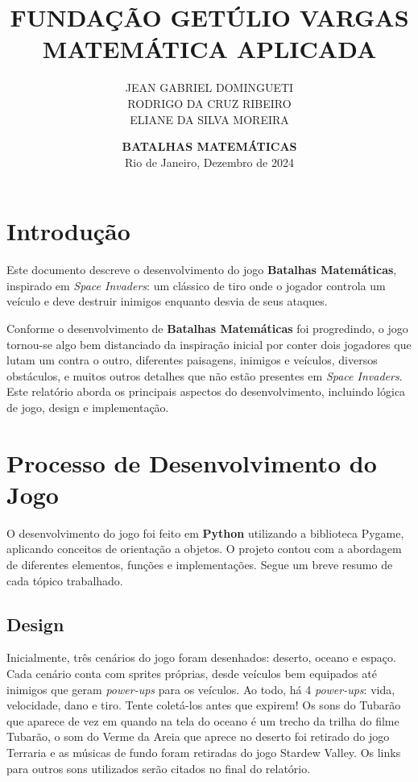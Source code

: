 \documentclass[12pt,a4paper]{article}
\title{\textbf{FUNDAÇÃO GETÚLIO VARGAS}\\ \textbf{MATEMÁTICA APLICADA}\\\vspace{3\baselineskip}}
\author{
    JEAN GABRIEL DOMINGUETI \\[1ex]
    RODRIGO DA CRUZ RIBEIRO \\[1ex]
    ELIANE DA SILVA MOREIRA
}
\date{\vspace{4\baselineskip}
    \large
    \textbf{BATALHAS MATEMÁTICAS}\\[6\baselineskip]
    Rio de Janeiro, Dezembro de 2024
}
\begin{document}
\newpage
\maketitle
\newpage
\renewcommand{\contentsname}{\centering{Sumário}}
\tableofcontents
\newpage

\section{Introdução}
Este documento descreve o desenvolvimento do jogo \textbf{Batalhas Matemáticas}, inspirado em \textit{Space Invaders}: um clássico de tiro onde o jogador controla um veículo e deve destruir inimigos enquanto desvia de seus ataques.

Conforme o desenvolvimento de \textbf{Batalhas Matemáticas} foi progredindo, o jogo tornou-se algo bem distanciado da inspiração inicial por conter dois jogadores que lutam um contra o outro, diferentes paisagens, inimigos e veículos, diversos obstáculos, e muitos outros detalhes que não estão presentes em \textit{Space Invaders}. Este relatório aborda os principais aspectos do desenvolvimento, incluindo lógica de jogo, design e implementação.

\section{Processo de Desenvolvimento do Jogo}
O desenvolvimento do jogo foi feito em \textbf{Python} utilizando a biblioteca Pygame, aplicando conceitos de orientação a objetos. O projeto contou com a abordagem de diferentes elementos, funções e implementações. Segue um breve resumo de cada tópico trabalhado.

\subsection{Design}
Inicialmente, três cenários do jogo foram desenhados: deserto, oceano e espaço. Cada cenário conta com sprites próprias, desde veículos bem equipados até inimigos que geram \textit{power-ups} para os veículos. 
Ao todo, há 4 \textit{power-ups}: vida, velocidade, dano e tiro. Tente coletá-los antes que expirem!
Os sons do Tubarão que aparece de vez em quando na tela do oceano é um trecho da trilha do filme Tubarão, o som do Verme da Areia que aprece no deserto foi retirado do jogo Terraria e as músicas de fundo foram retiradas do jogo Stardew Valley. Os links para outros sons utilizados serão citados no final do relatório.
\end{document}
